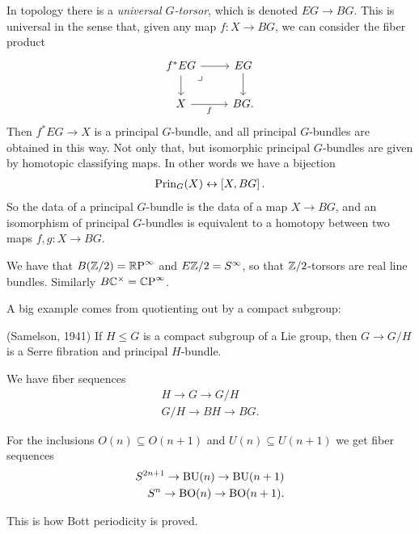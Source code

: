 \documentclass[11pt]{amsart}
\begin{document}
In topology there is a \textit{universal $G$-torsor}, which is denoted $EG \to BG$. This is universal in the sense that, given any map $f \colon X \to BG$, we can consider the fiber product
\[ \begin{tikzcd}
    f^\ast EG\rar\dar\pb & EG\dar\\
    X\rar["f" below] & BG.
\end{tikzcd} \]
Then $f^\ast EG \to X$ is a principal $G$-bundle, and all principal $G$-bundles are obtained in this way. Not only that, but isomorphic principal $G$-bundles are given by homotopic classifying maps. In other words we have a bijection
\begin{align*}
    \mathrm{Prin}_G(X) \leftrightarrow \left[ X,BG \right].
\end{align*}
%
So the data of a principal $G$-bundle is the data of a map $X \to BG$, and an isomorphism of principal $G$-bundles is equivalent to a homotopy between two maps $f,g \colon X \to BG$.

\begin{example} We have that $B(\mathbb{Z}/2) ={\mathbb{R}\text{P}}^\infty$ and $E\mathbb{Z}/2 = S^\infty$, so that $\mathbb{Z}/2$-torsors are real line bundles. Similarly $B\mathbb{C}^\times = {\mathbb{C}\text{P}}^\infty$.
\end{example}

A big example comes from quotienting out by a compact subgroup:

\begin{theorem} (Samelson, 1941) If $H \le G$ is a compact subgroup of a Lie group, then $G \to G/H$ is a Serre fibration and principal $H$-bundle.
\end{theorem}

\begin{corollary} We have fiber sequences
\begin{align*}
    H \to G \to G/H \\
    G/H \to BH \to BG.
\end{align*}
\end{corollary}

\begin{example} For the inclusions $O(n) \subseteq O(n+1)$ and $U(n) \subseteq U(n+1)$ we get fiber sequences
\begin{align*}
    S^{2n+1} \to \mathrm{BU}(n) \to \mathrm{BU}(n+1) \\
    S^n \to \mathrm{BO}(n) \to \mathrm{BO}(n+1).
\end{align*}
\end{example}
This is how Bott periodicity is proved.
\end{document}
